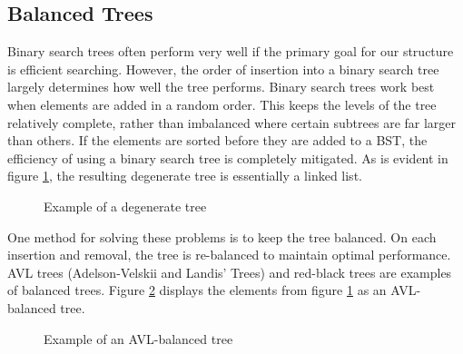 \subsection*{Balanced Trees}
Binary search trees often perform very well if the primary goal for our structure is efficient searching.
However, the order of insertion into a binary search tree largely determines how well the tree performs.
Binary search trees work best when elements are added in a random order.
This keeps the levels of the tree relatively complete, rather than imbalanced where certain subtrees are far larger than others.
If the elements are sorted before they are added to a BST, the efficiency of using a binary search tree is completely mitigated.
As is evident in figure \ref{fig:Degenerate Tree}, the resulting degenerate tree is essentially a linked list.
\begin{figure}
\centering
{}
\caption{Example of a degenerate tree}
\label{fig:Degenerate Tree}
\end{figure}

One method for solving these problems is to keep the tree balanced.
On each insertion and removal, the tree is re-balanced to maintain optimal performance.
AVL trees (Adelson-Velskii and Landis' Trees) and red-black trees are examples of balanced trees.
Figure \ref{fig:AVL btree} displays the elements from figure \ref{fig:Degenerate Tree} as an AVL-balanced tree.
\begin{figure}
\centering
{}
\caption{Example of an AVL-balanced tree}
\label{fig:AVL btree}
\end{figure}

